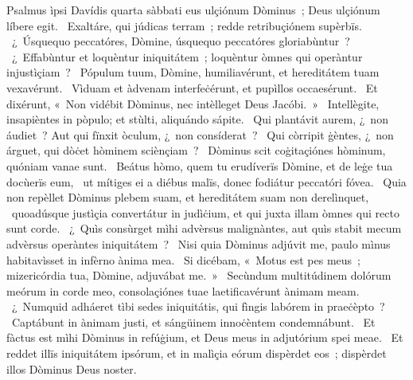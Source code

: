 { Psalmus ìpsi Davídis quarta sàbbati}
{%
eus ulçiónum Dòminus~; Deus ulçiónum líbere egit. 
~Exaltáre, qui júdicas terram~; redde retribuçiónem supèrbïs. 
~¿~Úsquequo peccatóres, Dòmine, úsquequo peccatóres gloriabùntur~? 
~¿~Effabùntur et loquèntur iniquitátem~; loquèntur òmnes qui operàntur injustìçiam~? 
~Pópulum tuum, Dòmine, humiliavérunt, et hereditátem tuam vexavérunt. 
~Vìduam et àdvenam interfeċérunt, et pupìllos occaesérunt. 
~Et dixérunt, «~Non vidébit Dòminus, nec intèlleget Deus Jacóbi.~»
~Intellègite, insapièntes in pòpulo; et stùlti, aliquándo sápite. 
~Qui plantávit aurem, ¿~non áudiet~? Aut qui fïnxit òculum, ¿~non consíderat~? 
~Qui còrripit ġèntes, ¿~non árguet, qui dòċet hòminem sciènçiam~? 
~Dòminus scit coġitaçiónes hòminum, quóniam vanae sunt. 
~Beátus hòmo, quem tu erudíverïs Dòmine, et de leġe tua docùerïs eum, 
~ut mítiges ei a diébus malïs, donec fodiátur peccatóri fóvea. 
~Quia non repèllet Dòminus plebem suam, et hereditátem suam non derelìnquet, 
~quoadúsque justìçia convertátur in judìċium, et qui juxta illam òmnes qui recto sunt corde. 
~¿~Quìs consùrget mìhi advèrsus malignàntes, aut quìs stabit mecum advèrsus operàntes iniquitátem~? 
~Nisi quia Dòminus adjúvit me, paulo mìnus habitavìsset in infèrno ànima mea. 
~Si dicébam, «~Motus est pes meus~; mizericórdia tua, Dòmine, adjuvábat me.~»
~Secùndum multitúdinem dolórum meórum in corde meo, consolaçiónes tuae laetificavérunt ànimam meam. 
~¿~Numquid adháeret tìbi sedes iniquitátis, qui fìngis labórem in praeċèpto~? 
~Captábunt in ànimam justi, et sángüinem innoċèntem condemnábunt. 
~Et fàctus est mìhi Dòminus in refúġium, et Deus meus in adjutórium spei meae. 
~Et reddet illïs iniquitátem ipsórum, et in malìçia eórum dispèrdet eos~; dispèrdet illos Dòminus Deus noster. 
}
